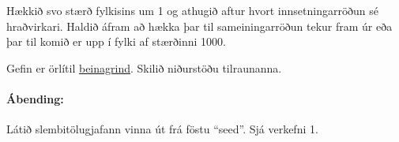 \documentclass{article}
\begin{document}
Hækkið svo stærð fylkisins um 1 og athugið aftur hvort innsetningarröðun sé hraðvirkari. Haldið áfram að hækka þar til sameiningarröðun tekur fram úr eða þar til komið er upp í fylki af stærðinni 1000.

Gefin er örlítil \href{https://raw.githubusercontent.com/Ernir/kennsluefni/master/T2/Code/w6/SortingCompetition.java}{beinagrind}. Skilið niðurstöðu tilraunanna.

\paragraph{Ábending:} Látið slembitölugjafann vinna út frá föstu ``seed''. Sjá verkefni 1.
\end{document}
